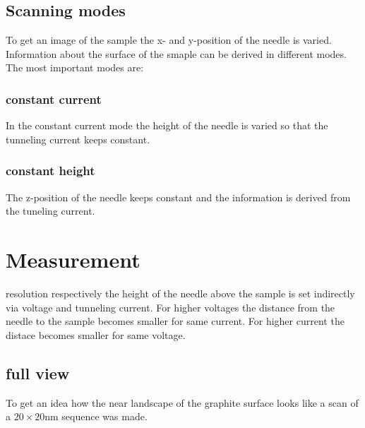 \documentclass[a4paper, parskip=half]{scrartcl}
\begin{document}
\subsection{Scanning modes}
To get an image of the sample the x- and y-position of the needle is varied. Information about the surface of the smaple can be derived in different modes. The  most important modes are: 
\subsubsection{constant current}
In the constant current mode the height of the needle is varied so that the tunneling current keeps constant.
\subsubsection{constant height}
The z-position of the needle keeps constant and the information is derived from the tuneling current.

\section{Measurement}
\The resolution respectively the height of the needle above the sample is set indirectly via voltage and tunneling current. For higher voltages the distance from the needle to the sample becomes smaller for same current. For higher current the distace becomes smaller for same voltage. 
\subsection{full view}
To get an idea how the near landscape of the graphite surface looks like a scan of a $20\times20 \text{nm}$ sequence was made.
\end{document}
